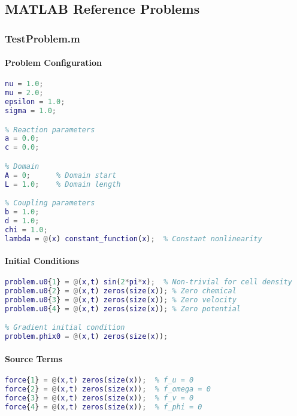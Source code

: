 \subsection{MATLAB Reference Problems}
\label{subsec:matlab_reference_problems}

\subsubsection{TestProblem.m}

\paragraph{Problem Configuration}
\begin{lstlisting}[language=Matlab, caption=MATLAB TestProblem.m Parameters]
% Physical parameters (viscosity)
nu = 1.0;
mu = 2.0;
epsilon = 1.0;
sigma = 1.0;

% Reaction parameters
a = 0.0;
c = 0.0;

% Domain
A = 0;      % Domain start
L = 1.0;    % Domain length

% Coupling parameters
b = 1.0;
d = 1.0;
chi = 1.0;
lambda = @(x) constant_function(x);  % Constant nonlinearity
\end{lstlisting}

\paragraph{Initial Conditions}
\begin{lstlisting}[language=Matlab, caption=TestProblem.m Initial Conditions]
% Initial data functions u0{i}(x,t)
problem.u0{1} = @(x,t) sin(2*pi*x);  % Non-trivial for cell density
problem.u0{2} = @(x,t) zeros(size(x)); % Zero chemical
problem.u0{3} = @(x,t) zeros(size(x)); % Zero velocity  
problem.u0{4} = @(x,t) zeros(size(x)); % Zero potential

% Gradient initial condition
problem.phix0 = @(x,t) zeros(size(x));
\end{lstlisting}

\paragraph{Source Terms}
\begin{lstlisting}[language=Matlab, caption=TestProblem.m Source Terms]
% All source terms are zero
force{1} = @(x,t) zeros(size(x));  % f_u = 0
force{2} = @(x,t) zeros(size(x));  % f_omega = 0
force{3} = @(x,t) zeros(size(x));  % f_v = 0
force{4} = @(x,t) zeros(size(x));  % f_phi = 0
\end{lstlisting}

